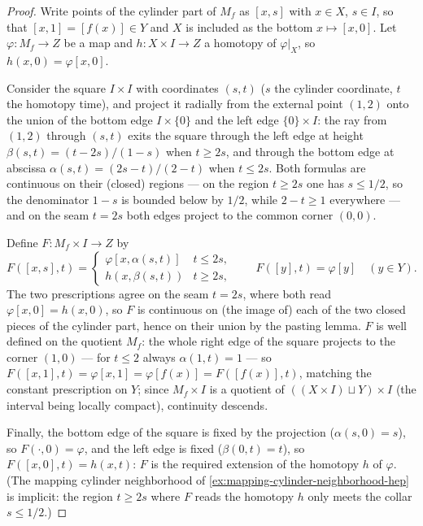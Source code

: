\begin{proof}
\leanok
Write points of the cylinder part of $M_f$ as $[x,s]$ with $x \in X$, $s \in I$, so
that $[x,1] = [f(x)] \in Y$ and $X$ is included as the bottom $x \mapsto [x,0]$. Let
$\varphi : M_f \to Z$ be a map and $h : X \times I \to Z$ a homotopy of
$\varphi|_X$, so $h(x,0) = \varphi[x,0]$.

Consider the square $I \times I$ with coordinates $(s,t)$ ($s$ the cylinder
coordinate, $t$ the homotopy time), and project it radially from the external point
$(1,2)$ onto the union of the bottom edge $I \times \{0\}$ and the left edge
$\{0\} \times I$: the ray from $(1,2)$ through $(s,t)$ exits the square through the
left edge at height $\beta(s,t) = (t-2s)/(1-s)$ when $t \ge 2s$, and through the
bottom edge at abscissa $\alpha(s,t) = (2s-t)/(2-t)$ when $t \le 2s$. Both formulas
are continuous on their (closed) regions — on the region $t \ge 2s$ one has
$s \le 1/2$, so the denominator $1-s$ is bounded below by $1/2$, while $2-t \ge 1$
everywhere — and on the seam $t = 2s$ both edges project to the common corner
$(0,0)$.

Define $F : M_f \times I \to Z$ by
\[
F([x,s],t) =
\begin{cases}
\varphi[x, \alpha(s,t)] & t \le 2s,\\
h(x, \beta(s,t)) & t \ge 2s,
\end{cases}
\qquad
F([y],t) = \varphi[y] \quad (y \in Y).
\]
The two prescriptions agree on the seam $t = 2s$, where both read
$\varphi[x,0] = h(x,0)$, so $F$ is continuous on (the image of) each of the two
closed pieces of the cylinder part, hence on their union by the pasting lemma. $F$ is
well defined on the quotient $M_f$: the whole right edge of the square projects to
the corner $(1,0)$ — for $t \le 2$ always $\alpha(1,t) = 1$ — so
$F([x,1],t) = \varphi[x,1] = \varphi[f(x)] = F([f(x)],t)$, matching the constant
prescription on $Y$; since $M_f \times I$ is a quotient of
$((X \times I) \sqcup Y) \times I$ (the interval being locally compact), continuity
descends.

Finally, the bottom edge of the square is fixed by the projection
($\alpha(s,0) = s$), so $F(\cdot,0) = \varphi$, and the left edge is fixed
($\beta(0,t) = t$), so $F([x,0],t) = h(x,t)$: $F$ is the required extension of the
homotopy $h$ of $\varphi$. (The mapping cylinder neighborhood of
\cref{ex:mapping-cylinder-neighborhood-hep} is implicit: the region $t \ge 2s$ where
$F$ reads the homotopy $h$ only meets the collar $s \le 1/2$.)
\end{proof}


